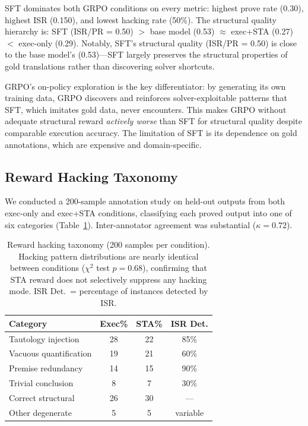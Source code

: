 \documentclass[11pt,a4paper]{article}
\begin{document}
SFT dominates both GRPO conditions on every metric: highest prove rate (0.30), highest ISR (0.150), and lowest hacking rate (50\%).
The structural quality hierarchy is: SFT (ISR/PR = 0.50) $>$ base model (0.53) $\approx$ exec+STA (0.27) $<$ exec-only (0.29).
Notably, SFT's structural quality (ISR/PR = 0.50) is close to the base model's (0.53)---SFT largely preserves the structural properties of gold translations rather than discovering solver shortcuts.

GRPO's on-policy exploration is the key differentiator: by generating its own training data, GRPO discovers and reinforces solver-exploitable patterns that SFT, which imitates gold data, never encounters.
This makes GRPO without adequate structural reward \emph{actively worse} than SFT for structural quality despite comparable execution accuracy.
The limitation of SFT is its dependence on gold annotations, which are expensive and domain-specific.

\subsection{Reward Hacking Taxonomy}
\label{sec:taxonomy}

We conducted a 200-sample annotation study on held-out outputs from both exec-only and exec+STA conditions, classifying each proved output into one of six categories (Table~\ref{tab:taxonomy}).
Inter-annotator agreement was substantial ($\kappa = 0.72$).

\begin{table}[t]
\centering
\small
\begin{tabular}{lccc}
\toprule
\textbf{Category} & \textbf{Exec\%} & \textbf{STA\%} & \textbf{ISR Det.} \\
\midrule
Tautology injection   & 28 & 22 & 85\% \\
Vacuous quantification & 19 & 21 & 60\% \\
Premise redundancy     & 14 & 15 & 90\% \\
Trivial conclusion     & 8  & 7  & 30\% \\
Correct structural     & 26 & 30 & --- \\
Other degenerate       & 5  & 5  & variable \\
\bottomrule
\end{tabular}
\caption{Reward hacking taxonomy (200 samples per condition). Hacking pattern distributions are nearly identical between conditions ($\chi^2$ test $p = 0.68$), confirming that STA reward does not selectively suppress any hacking mode. ISR Det.\ = percentage of instances detected by ISR.}
\label{tab:taxonomy}
\end{table}
\end{document}
